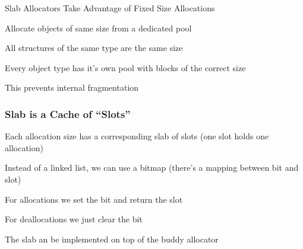   \begin{frame}{Slab Allocators Take Advantage of Fixed Size Allocations}

  Allocate objects of same size from a dedicated pool

  \hspace{2em} All structures of the same type are the same size

  \vspace{2em}

  Every object type has it's own pool with blocks of the correct size

    \hspace{2em} This prevents internal fragmentation
  \end{frame}

  \begin{frame}
    \frametitle{Slab is a Cache of ``Slots''}

    Each allocation size has a corresponding slab of slots (one slot holds one
    allocation)

    \vspace{2em}

    Instead of a linked list, we can use a bitmap (there's a mapping between
    bit and slot)

    \hspace{2em} For allocations we set the bit and return the slot

    \hspace{2em} For deallocations we just clear the bit

    \vspace{2em}

    The slab an be implemented on top of the buddy allocator
  \end{frame}


